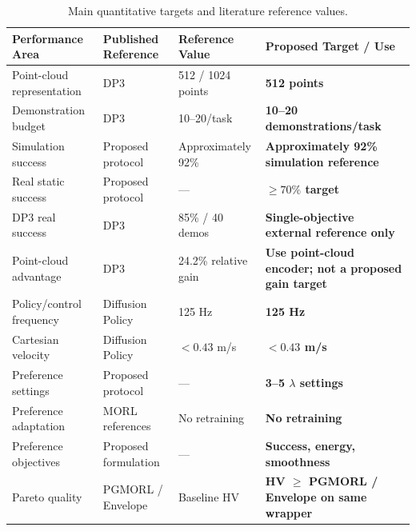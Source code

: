 \documentclass[journal]{IEEEtran}
\begin{document}
\begin{table}[t]
\centering
\caption{Main quantitative targets and literature reference values.}
\label{tab:quantitative_targets}
\renewcommand{\arraystretch}{1.3}
\setlength{\tabcolsep}{4pt}

\begin{tabular}{l l l l}
\toprule
\textbf{Performance Area}
&
\textbf{Published Reference}
&
\textbf{Reference Value}
&
\textbf{Proposed Target / Use}
\\
\midrule

Point-cloud representation
&
DP3 \cite{ze2024}
&
512 / 1024 points
&
\textbf{512 points}
\\

Demonstration budget
&
DP3 \cite{ze2024}
&
10--20/task
&
\textbf{10--20 demonstrations/task}
\\

Simulation success
&
Proposed protocol
&
Approximately 92\%
&
\textbf{Approximately 92\% simulation reference}
\\

Real static success
&
Proposed protocol
&
---
&
\textbf{$\geq70\%$ target}
\\

DP3 real success
&
DP3 \cite{ze2024}
&
85\% / 40 demos
&
\textbf{Single-objective external reference only}
\\

Point-cloud advantage
&
DP3 \cite{ze2024}
&
24.2\% relative gain
&
\textbf{Use point-cloud encoder; not a proposed gain target}
\\

Policy/control frequency
&
Diffusion Policy \cite{chi2023}
&
125 Hz
&
\textbf{125 Hz}
\\

Cartesian velocity
&
Diffusion Policy \cite{chi2023}
&
$<0.43$ m/s
&
\textbf{$<0.43$ m/s}
\\

Preference settings
&
Proposed protocol
&
---
&
\textbf{3--5 $\lambda$ settings}
\\

Preference adaptation
&
MORL references
&
No retraining
&
\textbf{No retraining}
\\

Preference objectives
&
Proposed formulation
&
---
&
\textbf{Success, energy, smoothness}
\\

Pareto quality
&
PGMORL / Envelope
&
Baseline HV
&
\textbf{HV $\geq$ PGMORL / Envelope on same wrapper}
\\


\end{tabular}
\end{table}
\end{document}
